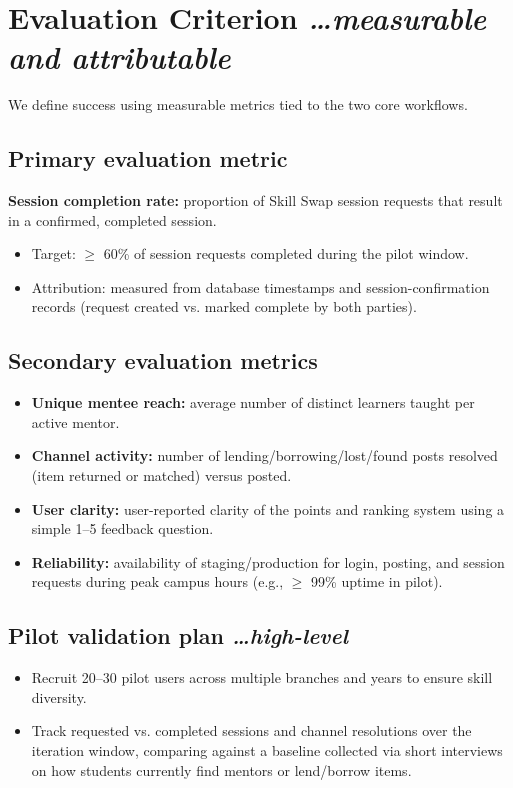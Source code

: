 \documentclass[11pt,a4paper]{article}
\newcommand{\BvrHint}[1]{%
  {\normalfont\normalsize\itshape\hfill #1}}
\begin{document}
\section{Evaluation Criterion %
\BvrHint{\ldots measurable and attributable}}
We define success using measurable metrics tied to the two core workflows.

\subsection{Primary evaluation metric}
\textbf{Session completion rate:} proportion of Skill Swap session requests that result in a confirmed, completed session.
\begin{itemize}[leftmargin=0.7cm]
    \item Target: $\ge$ 60\% of session requests completed during the pilot window.
    \item Attribution: measured from database timestamps and session-confirmation records (request created vs. marked complete by both parties).
\end{itemize}

\subsection{Secondary evaluation metrics}
\begin{itemize}[leftmargin=0.7cm]
    \item \textbf{Unique mentee reach:} average number of distinct learners taught per active mentor.
    \item \textbf{Channel activity:} number of lending/borrowing/lost/found posts resolved (item returned or matched) versus posted.
    \item \textbf{User clarity:} user-reported clarity of the points and ranking system using a simple 1--5 feedback question.
    \item \textbf{Reliability:} availability of staging/production for login, posting, and session requests during peak campus hours (e.g., $\ge$ 99\% uptime in pilot).
\end{itemize}

\subsection{Pilot validation plan %
\BvrHint{\ldots high-level}}
\begin{itemize}[leftmargin=0.7cm]
    \item Recruit 20--30 pilot users across multiple branches and years to ensure skill diversity.
    \item Track requested vs. completed sessions and channel resolutions over the iteration window, comparing against a baseline collected via short interviews on how students currently find mentors or lend/borrow items.
\end{itemize}
\end{document}
